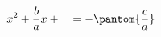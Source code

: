 \documentclass[preview]{standalone}
\begin{document}
\begin{align*}
x^2 + \frac{b}{a}x + {\phantom{\frac{c}{a}}} = - {\pantom{\frac{c}{a}}}
\end{align*}
\end{document}
